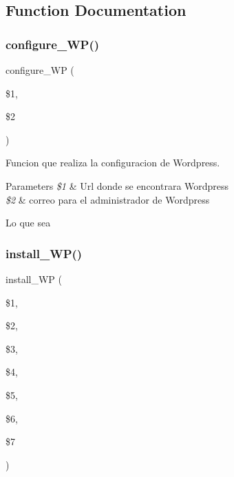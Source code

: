 \subsection{Function Documentation}
\mbox{\label{WP__Instalador__General_8sh_add91f549a7f408a6c51455ab9982ef5e}} 
\subsubsection{\texorpdfstring{configure\+\_\+\+W\+P()}{configure\_WP()}}
{\footnotesize\ttfamily configure\+\_\+\+WP (\begin{DoxyParamCaption}\item[{}]{\$1,  }\item[{}]{\$2 }\end{DoxyParamCaption})}



Funcion que realiza la configuracion de Wordpress. 


\begin{DoxyParams}{Parameters}
{\em \$1} & Url donde se encontrara Wordpress \\
\hline
{\em \$2} & correo para el administrador de Wordpress\\
\hline
\end{DoxyParams}
Lo que sea \mbox{\label{WP__Instalador__General_8sh_ab8bd4095cd5a5c54fa9256d3064f6d0f}} 
\subsubsection{\texorpdfstring{install\+\_\+\+W\+P()}{install\_WP()}}
{\footnotesize\ttfamily install\+\_\+\+WP (\begin{DoxyParamCaption}\item[{}]{\$1,  }\item[{}]{\$2,  }\item[{}]{\$3,  }\item[{}]{\$4,  }\item[{}]{\$5,  }\item[{}]{\$6,  }\item[{}]{\$7 }\end{DoxyParamCaption})}



